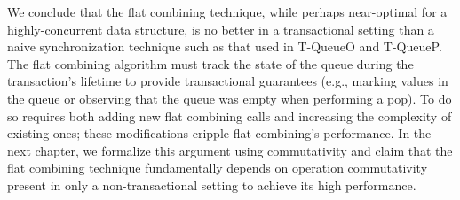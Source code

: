 We conclude that the flat combining technique, while perhaps near-optimal for a highly-concurrent data structure, is no better in a transactional setting than a naive synchronization technique such as that used in T-QueueO and T-QueueP. The flat combining algorithm must track the state of the queue during the transaction's lifetime to provide transactional guarantees (e.g., marking values in the queue or observing that the queue was empty when performing a pop). To do so requires both adding new flat combining calls and increasing the complexity of existing ones; these modifications cripple flat combining's performance.
In the next chapter, we formalize this argument using commutativity and claim that the flat combining technique fundamentally depends on operation commutativity present in only a non-transactional setting to achieve its high performance. 
